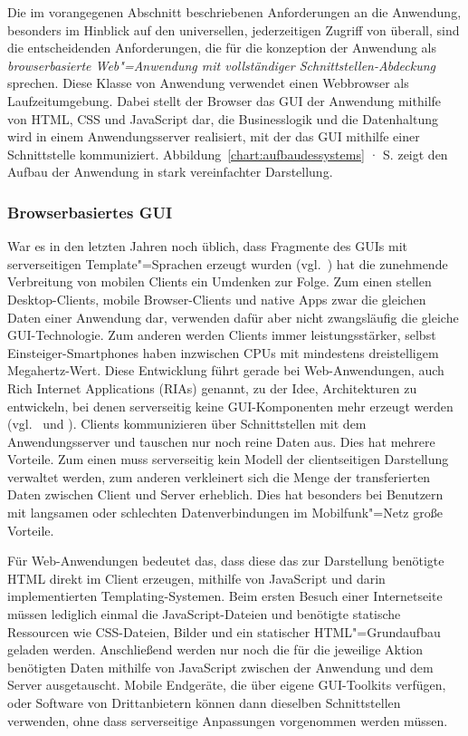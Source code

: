Die im vorangegenen Abschnitt beschriebenen Anforderungen an die Anwendung, besonders im Hinblick auf den universellen, jederzeitigen Zugriff von überall, sind die entscheidenden Anforderungen, die für die konzeption der Anwendung als \emph{browserbasierte Web"=Anwendung mit vollständiger Schnittstellen-Abdeckung} sprechen. Diese Klasse von Anwendung verwendet einen Webbrowser als Laufzeitumgebung. Dabei stellt der Browser das GUI der Anwendung mithilfe von HTML, CSS und JavaScript dar, die Businesslogik und die Datenhaltung wird in einem Anwendungsserver realisiert, mit der das GUI mithilfe einer Schnittstelle kommuniziert. Abbildung~\ref{chart:aufbaudessystems} · S.\pageref{chart:aufbaudessystems} zeigt den Aufbau der Anwendung in stark vereinfachter Darstellung. 

\subsubsection{Browserbasiertes GUI}

War es in den letzten Jahren noch üblich, dass Fragmente des GUIs mit serverseitigen Template"=Sprachen erzeugt wurden (vgl.~\cite[S.48]{dunkel2008systemarchitekturen}) hat die zunehmende Verbreitung von mobilen Clients ein Umdenken zur Folge. Zum einen stellen Desktop-Clients, mobile Browser-Clients und native Apps zwar die gleichen Daten einer Anwendung dar, verwenden dafür aber nicht zwangsläufig die gleiche GUI-Technologie. Zum anderen werden Clients immer leistungsstärker, selbst Einsteiger-Smartphones haben inzwischen CPUs mit mindestens dreistelligem Megahertz-Wert. Diese Entwicklung führt gerade bei Web-Anwendungen, auch Rich Internet Applications (RIAs) genannt, zu der Idee, Architekturen zu entwickeln, bei denen serverseitig keine GUI-Komponenten mehr erzeugt werden (vgl.~\cite{maccaw2011javascript} und \cite{coates2012phptemplating}). Clients kommunizieren über Schnittstellen mit dem Anwendungsserver und tauschen nur noch reine Daten aus. Dies hat mehrere Vorteile. Zum einen muss serverseitig kein Modell der clientseitigen Darstellung verwaltet werden, zum anderen verkleinert sich die Menge der transferierten Daten zwischen Client und Server erheblich. Dies hat besonders bei Benutzern mit langsamen oder schlechten Datenverbindungen im Mobilfunk"=Netz große Vorteile. 

Für Web-Anwendungen bedeutet das, dass diese das zur Darstellung benötigte HTML direkt im Client erzeugen, mithilfe von JavaScript und darin implementierten Templating-Systemen. Beim ersten Besuch einer Internetseite müssen lediglich einmal die JavaScript-Dateien und benötigte statische Ressourcen wie CSS-Dateien, Bilder und ein statischer HTML"=Grundaufbau geladen werden. Anschließend werden nur noch die für die jeweilige Aktion benötigten Daten mithilfe von JavaScript zwischen der Anwendung und dem Server ausgetauscht. Mobile Endgeräte, die über eigene GUI-Toolkits verfügen, oder Software von Drittanbietern können dann dieselben Schnittstellen verwenden, ohne dass serverseitige Anpassungen vorgenommen werden müssen.

